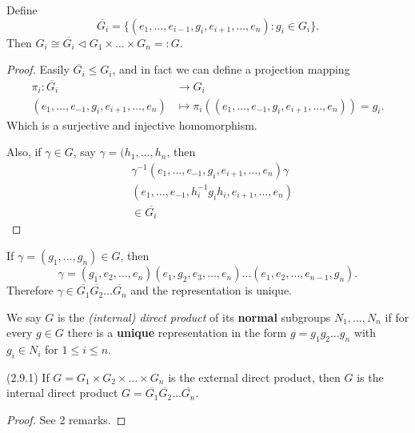 \begin{remark}
	Define \[
		\overline{G_i} = \{(e_1,\ldots,e_{i-1}, g_i, e_{i+1},\ldots,e_n): g_i \in G_i\} 
	.\] 
	Then $G_i \cong \overline{G_i} \triangleleft G_1 \times \ldots\times G_n =:G$.
	\begin{proof}
		Easily $\overline{G_i} \le G_i$, and in fact we can define a projection mapping
		\begin{align*}
			\pi_i: \overline{G_i}  &\longrightarrow G_i \\
			(e_1,\ldots,e_{-1}, g_i, e_{i+1}, \ldots, e_n) &\longmapsto \pi_i((e_1,\ldots,e_{-1}, g_i, e_{i+1}, \ldots, e_n)) = g_i
		.\end{align*}
		Which is a surjective and injective homomorphism.

		Also, if $\gamma \in G$, say $\gamma = (h_1, \ldots, h_n$, then
		\begin{align*}
			&\gamma^{-1}(e_1,\ldots,e_{-1}, g_i, e_{i+1}, \ldots, e_n) \gamma\\
			&(e_1,\ldots,e_{-1}, h_i^{-1}g_ih_i, e_{i+1}, \ldots, e_n) \\
			&\in \overline{G_i} 
		\end{align*}
	\end{proof}
	
\end{remark}

\begin{remark}
	If $\gamma = (g_1, \ldots, g_n) \in G$, then \[
		\gamma = (g_1, e_2,\ldots,e_n)(e_1,g_2, e_3,\ldots,e_n)\ldots(e_1,e_2,\ldots,e_{n-1},g_n)
	.\] 
	Therefore $\gamma \in \overline{G_1} \overline{G_2} \ldots \overline{G_n} $ and the representation is unique.
\end{remark}

\begin{definition}
	We say $G$ is the \textit{(internal) direct product} of its \textbf{normal} subgroups $N_1, \ldots, N_n$ if for every $g \in G$ there is a \textbf{unique} representation in the form $g = g_1g_2\ldots g_n$ with $g_i \in N_i$ for $1\le i\le n$.
\end{definition}

\begin{lemma}
	(2.9.1) If $G = G_1 \times G_2 \times \ldots \times G_n$ is the external direct product, then $G$ is the internal direct product $G = \overline{G_1} \overline{G_2} \ldots \overline{G_n} $.
\end{lemma}
\begin{proof}
	See 2 remarks.
\end{proof}



